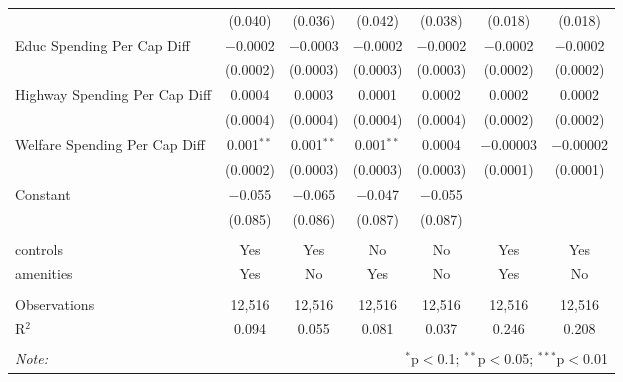 \begin{table}[!htbp]
\begin{tabular}{@{\extracolsep{5pt}}lcccccc}
  & (0.040) & (0.036) & (0.042) & (0.038) & (0.018) & (0.018) \\ 
  Educ Spending Per Cap Diff & $-$0.0002 & $-$0.0003 & $-$0.0002 & $-$0.0002 & $-$0.0002 & $-$0.0002 \\ 
  & (0.0002) & (0.0003) & (0.0003) & (0.0003) & (0.0002) & (0.0002) \\ 
  Highway Spending Per Cap Diff & 0.0004 & 0.0003 & 0.0001 & 0.0002 & 0.0002 & 0.0002 \\ 
  & (0.0004) & (0.0004) & (0.0004) & (0.0004) & (0.0002) & (0.0002) \\ 
  Welfare Spending Per Cap Diff & 0.001$^{**}$ & 0.001$^{**}$ & 0.001$^{**}$ & 0.0004 & $-$0.00003 & $-$0.00002 \\ 
  & (0.0002) & (0.0003) & (0.0003) & (0.0003) & (0.0001) & (0.0001) \\ 
  Constant & $-$0.055 & $-$0.065 & $-$0.047 & $-$0.055 &  &  \\ 
  & (0.085) & (0.086) & (0.087) & (0.087) &  &  \\ 
 \hline \\[-1.8ex] 
controls & Yes & Yes & No & No & Yes & Yes \\ 
amenities & Yes & No & Yes & No & Yes & No \\ 
\hline \\[-1.8ex] 
Observations & 12,516 & 12,516 & 12,516 & 12,516 & 12,516 & 12,516 \\ 
R$^{2}$ & 0.094 & 0.055 & 0.081 & 0.037 & 0.246 & 0.208 \\ 
\hline 
\hline \\[-1.8ex] 
\textit{Note:}  & \multicolumn{6}{r}{$^{*}$p$<$0.1; $^{**}$p$<$0.05; $^{***}$p$<$0.01} \\ 
\end{tabular} 
\end{table} 
